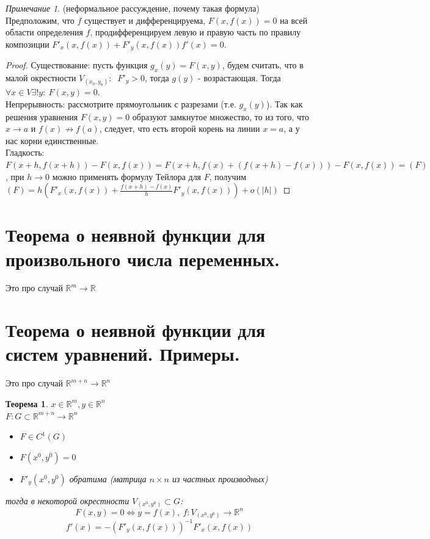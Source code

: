 \documentclass{article}
\theoremstyle{indented}
\newtheorem{theorem}{Теорема}
\theoremstyle{definition}
\theoremstyle{remark}
\newtheorem*{remark}{Примечание}
\begin{document}
\begin{remark}
    (неформальное рассуждение, почему такая формула) Предположим, что $f$ существует и дифференцируема,
    $F(x,f(x))=0$ на всей области определения $f$, продифференцируем левую и правую часть по правилу композиции
    $F'_x(x,f(x))+F'_y(x,f(x)) f'(x)=0$.
\end{remark}

\begin{proof}
    Существование: пусть функция $g_x(y) = F(x,y)$, будем считать, что в малой окрестности $V_{(x_0,y_0)}: \ $ 
    $F'_y > 0$, тогда $g(y)$ - возрастающая. Тогда $\forall x \in V \exists ! y: \ F(x,y)=0$. \\
    Непрерывность: рассмотрите прямоугольник с разрезами (т.е. $g_x(y)$). Так как решения уравнения $F(x,y)=0$ образуют
    замкнутое множество, то из того, что $x \to a$ и $f(x) \not\to f(a)$, следует, что есть второй корень на линии $x=a$, а у 
    нас корни единственные. \\
    Гладкость: $F(x+h,f(x+h))-F(x,f(x))=F(x+h,f(x)+(f(x+h)-f(x)))-F(x,f(x))=(F)$, при $h\to 0$ можно применять формулу Тейлора 
    для $F$, получим $(F)=h(F'_x(x,f(x))+\frac{f(x+h)-f(x)}{h}F'_y(x,f(x)))+o(|h|)$
\end{proof}


\section{Теорема о неявной функции для произвольного числа переменных.}%


Это про случай $\mathbb{R}^m \to \mathbb{R}$


\section{Теорема о неявной функции для систем уравнений. Примеры.}%

Это про случай $\mathbb{R}^{m+n} \to \mathbb{R}^n$
\begin{theorem}
    $x\in \mathbb{R}^m , y \in \mathbb{R}^n$\\
    $F: G\subset\mathbb{R}^{m+n}\to \mathbb{R}^n$
    \begin{itemize}
        \item $F\in C^1(G)$
        \item $F(x^0,y^0)=0$
        \item $F'_y(x^0,y^0)$ обратима (матрица $n\times n$ из частных производных)
    \end{itemize}
    тогда в некоторой окрестности $V_{(x^0,y^0)} \subset G$: 
    $$F(x,y) = 0 \Leftrightarrow y=f(x), \ f: V_{(x^0,y^0)} \to \mathbb{R}^n$$
    $$f'(x) = -(F'_y(x,f(x)))^{-1} F'_x(x,f(x))$$
\end{theorem}
\end{document}
